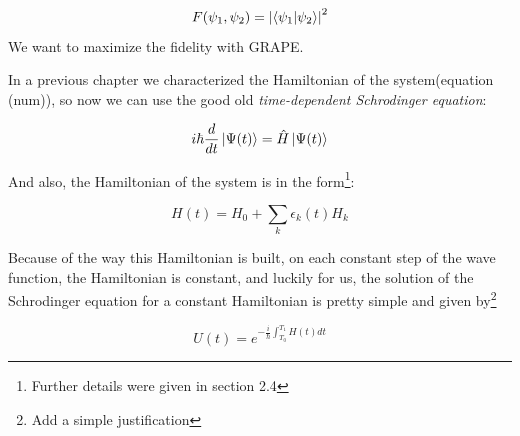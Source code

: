 \documentclass{article}
\numberwithin{equation}{section} %
\begin{document}
\begin{equation}
F(\psi_1, \psi_2) = \abs{\braket{\psi_1}{\psi_2}}^2
\end{equation}
We want to maximize the fidelity with GRAPE.\par
In a previous chapter we characterized the Hamiltonian of the system(equation (num)), so now we can use the good old \textit{time-dependent Schrodinger equation}:

\begin{equation}
i\hbar\frac{d}{dt}\ket{\Psi(t)} = \hat{H}\ket{\Psi(t)}
\end{equation}

And also, the Hamiltonian of the system is in the form\footnote{Further details were given in section 2.4}:

\begin{equation}
H(t) = H_0 + \sum_k{\epsilon_k(t) H_k} %
\end{equation}

Because of the way this Hamiltonian is built, on each constant step of the wave function, the Hamiltonian is constant, and luckily for us, the solution of the Schrodinger equation for a constant Hamiltonian is pretty simple and given by\footnote{Add a simple justification}

\begin{equation}
U(t) = e^{-\frac{i}{\hbar}\int_{T_0}^{T_1}H(t)dt}
\end{equation}
\end{document}
